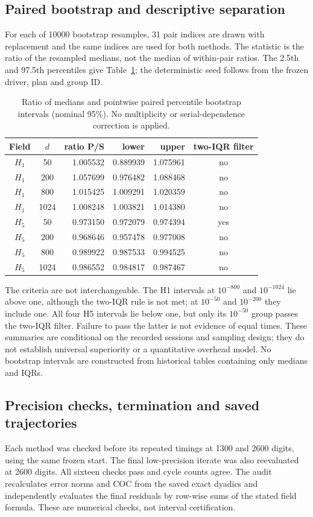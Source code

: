 \documentclass[11pt]{article}
\begin{document}
\subsection{Paired bootstrap and descriptive separation}
For each of 10000 bootstrap resamples, 31 pair indices are drawn with replacement and the same indices are used for both methods. The statistic is the ratio of the resampled medians, not the median of within-pair ratios. The 2.5th and 97.5th percentiles give Table~\ref{tab:mp-bootstrap}; the deterministic seed follows from the frozen driver, plan and group ID.
\begin{table}[htbp]\centering\small
\caption{Ratio of medians and pointwise paired percentile bootstrap intervals (nominal 95\%). No multiplicity or serial-dependence correction is applied.}\label{tab:mp-bootstrap}
\begin{tabular}{ccrrrc}\toprule
Field & $d$ & ratio P/S & lower & upper & two-IQR filter\\\midrule
$H_{1}$ & 50 & 1.005532 & 0.889939 & 1.075961 & no\\
$H_{1}$ & 200 & 1.057699 & 0.976482 & 1.088468 & no\\
$H_{1}$ & 800 & 1.015425 & 1.009291 & 1.020359 & no\\
$H_{1}$ & 1024 & 1.008248 & 1.003821 & 1.014380 & no\\
\midrule
$H_{5}$ & 50 & 0.973150 & 0.972079 & 0.974394 & yes\\
$H_{5}$ & 200 & 0.968646 & 0.957478 & 0.977008 & no\\
$H_{5}$ & 800 & 0.989922 & 0.987533 & 0.994525 & no\\
$H_{5}$ & 1024 & 0.986552 & 0.984817 & 0.987467 & no\\
\bottomrule\end{tabular}\end{table}
\FloatBarrier
The criteria are not interchangeable. The H1 intervals at $10^{-800}$ and $10^{-1024}$ lie above one, although the two-IQR rule is not met; at $10^{-50}$ and $10^{-200}$ they include one. All four H5 intervals lie below one, but only its $10^{-50}$ group passes the two-IQR filter. Failure to pass the latter is not evidence of equal times. These summaries are conditional on the recorded sessions and sampling design; they do not establish universal superiority or a quantitative overhead model. No bootstrap intervals are constructed from historical tables containing only medians and IQRs.

\subsection{Precision checks, termination and saved trajectories}\label{subsec:mp-checks}
Each method was checked before its repeated timings at 1300 and 2600 digits, using the same frozen start. The final low-precision iterate was also reevaluated at 2600 digits. All sixteen checks pass and cycle counts agree. The audit recalculates error norms and COC from the saved exact dyadics and independently evaluates the final residuals by row-wise sums of the stated field formula. These are numerical checks, not interval certification.
\end{document}

